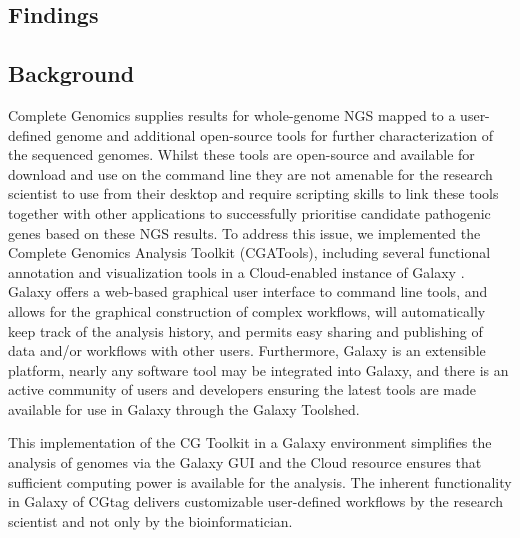 \documentclass[10pt]{bmc_article}
\newenvironment{bmcformat}{\begin{raggedright}\baselineskip20pt\sloppy\setboolean{publ}{false}}{\end{raggedright}\baselineskip20pt\sloppy}
\begin{document}
\begin{bmcformat}
\section*{Findings }
\subsection*{Background}
Complete Genomics supplies results for whole-genome NGS mapped to a user-defined genome \cite{ma} and additional open-source tools \cite{url-cgatools} for further characterization of the sequenced genomes.  Whilst these tools are open-source and available for download and use on the command line they are not amenable for the research scientist to use from their desktop and require scripting skills to link these tools together with other applications to successfully prioritise candidate pathogenic genes based on these NGS results.  To address this issue, we implemented the Complete Genomics Analysis Toolkit (CGATools), including several functional annotation and visualization tools in a Cloud-enabled instance of Galaxy \cite{drmanac}.  Galaxy offers a web-based graphical user interface to command line tools, and allows for the graphical construction of complex workflows, will automatically keep track of the analysis history, and permits easy sharing and publishing of data and/or workflows with other users. Furthermore, Galaxy is an extensible platform, nearly any software tool may be integrated into Galaxy, and there is an active community of users and developers ensuring the latest tools are made available for use in Galaxy through the Galaxy Toolshed.

This implementation of the CG Toolkit in a Galaxy environment simplifies the analysis of genomes via the Galaxy GUI and the Cloud resource ensures that sufficient computing power is available for the analysis.  The inherent functionality in Galaxy of CGtag delivers customizable user-defined workflows by the research scientist and not only by the bioinformatician.   


\end{bmcformat}
\end{document}
